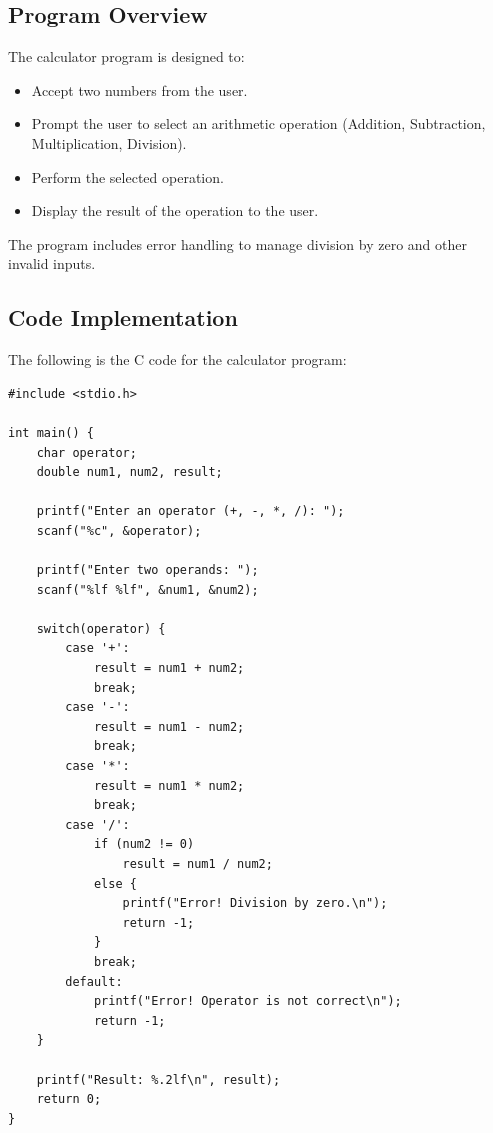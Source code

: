 \documentclass{article}
\begin{document}
\subsection{Program Overview}
The calculator program is designed to:
\begin{itemize}
    \item Accept two numbers from the user.
    \item Prompt the user to select an arithmetic operation (Addition, Subtraction, Multiplication, Division).
    \item Perform the selected operation.
    \item Display the result of the operation to the user.
\end{itemize}

The program includes error handling to manage division by zero and other invalid inputs.

\subsection{Code Implementation}
The following is the C code for the calculator program:

\begin{verbatim}
#include <stdio.h>

int main() {
    char operator;
    double num1, num2, result;

    printf("Enter an operator (+, -, *, /): ");
    scanf("%c", &operator);

    printf("Enter two operands: ");
    scanf("%lf %lf", &num1, &num2);

    switch(operator) {
        case '+':
            result = num1 + num2;
            break;
        case '-':
            result = num1 - num2;
            break;
        case '*':
            result = num1 * num2;
            break;
        case '/':
            if (num2 != 0)
                result = num1 / num2;
            else {
                printf("Error! Division by zero.\n");
                return -1;
            }
            break;
        default:
            printf("Error! Operator is not correct\n");
            return -1;
    }

    printf("Result: %.2lf\n", result);
    return 0;
}
\end{verbatim}
\end{document}
